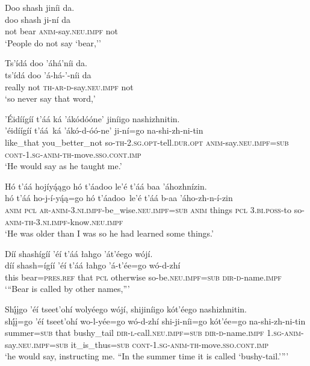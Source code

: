 \ea\label{ex:text6-2-6}
Doo shash jiníi da.\\
\gll doo	shash	ji-ní	da\\
     not	bear	\textsc{anim}-say.\textsc{neu}.\textsc{impf}	not\\
\glt `People do not say `bear,'{'}
\z

\ea\label{ex:text6-2-7}
Ts’ídá doo ’áhá’níi da.\\
\gll ts’ídá	doo	’á-há-’-níi	da\\
     really	not	\textsc{th}-\textsc{ar}-\textsc{d}-say.\textsc{neu}.\textsc{impf}	not\\
\glt `so never say that word,'
\z

\newpage
\ea\label{ex:text6-2-8}
’Éidíígíí t’áá ká ’ákódóóne’ jiníigo nashizhnitin.\\
\gll ’éidíígíí	t’áá~{ká}	’ákó-d-óó-ne’	ji-ní=go	na-shi-zh-ni-tin\\
     like\_that	you\_better\_not	so-\textsc{th}-2.\textsc{sg}.\textsc{opt}-tell.\textsc{dur}.\textsc{opt}	\textsc{anim}-say.\textsc{neu}.\textsc{impf}=\textsc{sub}	\textsc{cont}-1.\textsc{sg}-\textsc{anim}-\textsc{th}-move.\textsc{sso}.\textsc{cont}.\textsc{imp}\\
\glt `He would say as he taught me.'
\z

\ea\label{ex:text6-2-9}
Hó t’áá hojíyą́ągo hó t’áadoo le’é t’áá baa ’áhozhnízin.\\
\gll hó	t’áá	ho-j-í-yą́ą=go	hó	t’áadoo~{le’é}	t’áá	b-aa	’áho-zh-n-í-zin\\
     \textsc{anim}	\textsc{pcl}	\textsc{ar}-\textsc{anim}-3.\textsc{ni}.\textsc{impf}-be\_wise.\textsc{neu}.\textsc{impf}=\textsc{sub}	\textsc{anim}	things	\textsc{pcl}	3.\textsc{bi}.\textsc{poss}-to	so-\textsc{anim}-\textsc{th}-3.\textsc{ni}.\textsc{impf}-know.\textsc{neu}.\textsc{impf}\\
\glt `He was older than I was so he had learned some things.'
\z

\ea\label{ex:text6-2-10}
Díí shashígíí ’éí t’áá łahgo ’át’éego wójí.\\
\gll díí	shash=ígíí	’éí	t’áá	łahgo	’á-t’ée=go	wó-d-zhí\\
     this	bear=\textsc{pres}.\textsc{ref}	that	\textsc{pcl}	otherwise	so-be.\textsc{neu}.\textsc{impf}=\textsc{sub}	\textsc{dir}-\textsc{d}-name.\textsc{impf}\\
\glt `“Bear is called by other names,'''
\z

\ea\label{ex:text6-2-11}
Shį́įgo ’éí tseet’ohí wolyéego wójí, shijiníigo kót’éego nashizhnitin.\\
\gll shį́į=go	’éí	tseet’ohí	wo-l-yée=go	wó-d-zhí	shi-ji-níi=go	kót’ée=go	na-shi-zh-ni-tin\\
     summer=\textsc{sub}	that	bushy\_tail	\textsc{dir}-\textsc{l}-call.\textsc{neu}.\textsc{impf}=\textsc{sub}	\textsc{dir}-\textsc{d}-name.\textsc{impf}	1.\textsc{sg}-\textsc{anim}-say.\textsc{neu}.\textsc{impf}=\textsc{sub}	it\_is\_thus=\textsc{sub}	\textsc{cont}-1.\textsc{sg}-\textsc{anim}-\textsc{th}-move.\textsc{sso}.\textsc{cont}.\textsc{imp}\\
\glt `he would say, instructing me. ``In the summer time it is called `bushy-tail.'{''}'
\z

